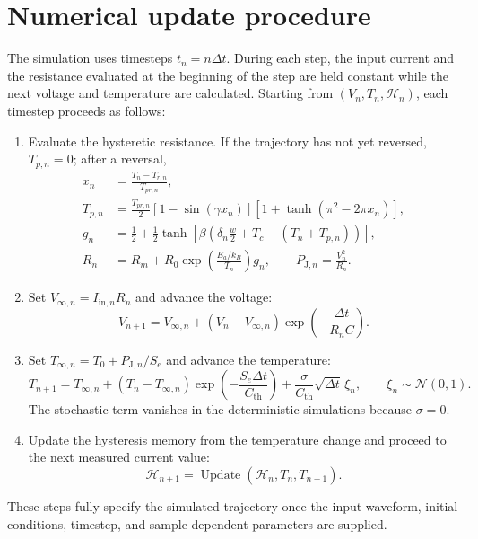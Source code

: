 \clearpage
\section{Numerical update procedure}
\label{sec:numerical_update}

The simulation uses timesteps $t_n=n\Delta t$. During each step, the input
current and the resistance evaluated at the beginning of the step are held
constant while the next voltage and temperature are calculated. Starting from
$(V_n,T_n,\mathcal H_n)$, each timestep proceeds as follows:

\begin{enumerate}
    \item Evaluate the hysteretic resistance. If the trajectory has not yet
    reversed, $T_{p,n}=0$; after a reversal,
    \begin{align}
        x_n&=\frac{T_n-T_{r,n}}{T_{pr,n}},\\
        T_{p,n}&=\frac{T_{pr,n}}{2}
        \left[1-\sin(\gamma x_n)\right]
        \left[1+\tanh\!\left(\pi^2-2\pi x_n\right)\right],\\
        g_n&=\frac{1}{2}+\frac{1}{2}\tanh\!\left[
        \beta\left(\delta_n\frac{w}{2}+T_c-(T_n+T_{p,n})\right)\right],\\
        R_n&=R_m+R_0\exp\!\left(\frac{E_a/k_B}{T_n}\right)g_n,
        \qquad
        P_{\mathrm J,n}=\frac{V_n^2}{R_n}.
        \label{eq:discrete_resistance_power}
    \end{align}

    \item Set $V_{\infty,n}=I_{\mathrm{in},n}R_n$ and advance the voltage:
    \begin{equation}
        V_{n+1}=V_{\infty,n}
        +\left(V_n-V_{\infty,n}\right)
        \exp\!\left(-\frac{\Delta t}{R_nC}\right).
        \label{eq:discrete_voltage}
    \end{equation}

    \item Set $T_{\infty,n}=T_0+P_{\mathrm J,n}/S_e$ and advance the
    temperature:
    \begin{equation}
        T_{n+1}=T_{\infty,n}
        +\left(T_n-T_{\infty,n}\right)
        \exp\!\left(-\frac{S_e\Delta t}{C_{\mathrm{th}}}\right)
        +\frac{\sigma}{C_{\mathrm{th}}}\sqrt{\Delta t}\,\xi_n,
        \qquad \xi_n\sim\mathcal N(0,1).
        \label{eq:discrete_temperature}
    \end{equation}
    The stochastic term vanishes in the deterministic simulations because
    $\sigma=0$.

    \item Update the hysteresis memory from the temperature change and proceed
    to the next measured current value:
    \begin{equation}
        \mathcal H_{n+1}
        =\operatorname{Update}\!\left(\mathcal H_n,T_n,T_{n+1}\right).
        \label{eq:discrete_hysteresis_update}
    \end{equation}
\end{enumerate}

These steps fully specify the simulated trajectory once the input waveform,
initial conditions, timestep, and sample-dependent parameters are supplied.
